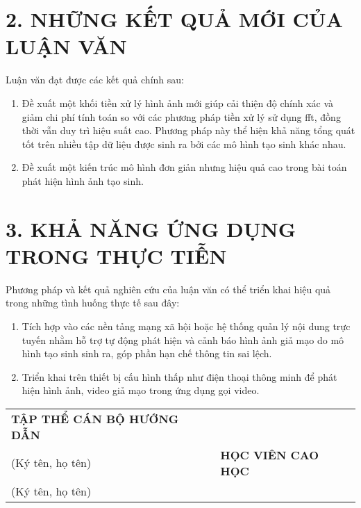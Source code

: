 \section*{2. NHỮNG KẾT QUẢ MỚI CỦA LUẬN VĂN}
Luận văn đạt được các kết quả chính sau:

\begin{enumerate}
	\item Đề xuất một khối tiền xử lý hình ảnh mới giúp cải thiện độ chính xác và giảm chi phí tính toán so với các phương pháp tiền xử lý sử dụng \gls{fft}, đồng thời vẫn duy trì hiệu suất cao. Phương pháp này thể hiện khả năng tổng quát tốt trên nhiều tập dữ liệu được sinh ra bởi các mô hình tạo sinh khác nhau.


	\item Đề xuất một kiến trúc mô hình đơn giản nhưng hiệu quả cao trong bài toán phát hiện hình ảnh tạo sinh.
	
	
\end{enumerate}

\section*{3. KHẢ NĂNG ỨNG DỤNG TRONG THỰC TIỄN}
Phương pháp và kết quả nghiên cứu của luận văn có thể triển khai hiệu quả trong những tình huống thực tế sau đây:

\begin{enumerate}
	\item Tích hợp vào các nền tảng mạng xã hội hoặc hệ thống quản lý nội dung trực tuyến nhằm hỗ trợ tự động phát hiện và cảnh báo hình ảnh giả mạo do mô hình tạo sinh sinh ra, góp phần hạn chế thông tin sai lệch.
	
	\item Triển khai trên thiết bị cấu hình thấp như điện thoại thông minh để phát hiện hình ảnh, video giả mạo trong ứng dụng gọi video.
	
\end{enumerate}
\vspace*{3cm}
\begin{center}
	\begin{tabular}{p{} p{}}
		\centering
		{\fontsize{12pt}{16pt}\selectfont \bfseries TẬP THỂ CÁN BỘ HƯỚNG DẪN}\\
		{\fontsize{12pt}{14pt}\selectfont (Ký tên, họ tên)} 
		&
		\centering
		{\fontsize{12pt}{16pt}\selectfont \bfseries HỌC VIÊN CAO HỌC}\\
		{\fontsize{12pt}{14pt}\selectfont (Ký tên, họ tên)}
	\end{tabular}
\end{center}

